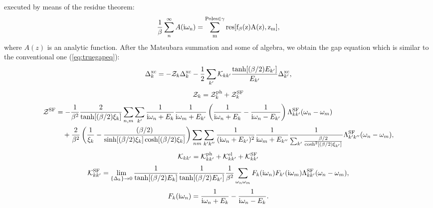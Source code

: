 executed by means of the residue theorem:
%
\begin{equation}
	\frac{1}{\beta} \sum_{n}^{\infty}A(\rm i\omega_n) = 
	\sum_{m}^{{\rm Poles} \in \gamma} {\rm res}[f_{\beta}(z)A(z),z_{m}],
	\label{eq:residue}
\end{equation}
%
where $A(z)$ is an analytic function. After the Matsubara summation and some of algebra, we obtain
the gap equation which is similar to the conventional one (\ref{eq:truegapeq}):
%
\begin{equation}
	\Delta^{\rm xc}_{k} = -{\mathcal Z}_{k}\Delta^{\rm xc}_{k} - \frac{1}{2}
	\sum_{k'} {\mathcal K}_{kk'} \frac{\tanh[(\beta/2)E_{k'}]}
	{E_{k'}} \Delta^{\rm xc}_{k'},
	\label{eq:aftergapeq}
\end{equation}
%
\begin{equation}
	\mathcal Z_{k} = \mathcal Z^{\rm ph}_{k} + \mathcal Z^{\rm SF}_{k} 
	\label{eq:Zsum}
\end{equation}
%
\begin{equation}
	\begin{split}
	\mathcal Z^{\rm SF} &= - \frac{1}{\beta^2}\frac{2}{\tanh[(\beta/2)\xi_{k}]} 
	\sum_{n,m}\sum_{k'}\frac{1}{{\rm i}\omega_n + E_k}\frac{1}{{\rm i}\omega_m + E_{k'}}
	\left(\frac{1}{{\rm i}\omega_n + E_k} - \frac{1}{ {\rm i}\omega_n - E_{k'}} \right)\Lambda^{\rm SF}_{kk'}(\omega_n - \omega_m) \\
	&\quad + \frac{2}{\beta^2}\left(\frac{1}{\xi_k} - \frac{(\beta/2)}{\sinh[(\beta/2)\xi_k]\cosh[(\beta/2)\xi_k]} \right)
	\sum_{nm}\sum_{k'k''} \frac{1}{({\rm i}\omega_n + E_{k'})^2} \frac{1}{ {\rm i}\omega_m + E_{k''}}
	\frac{1}{\sum_{k'}\frac{\beta/2}{\cosh^2\left[(\beta/2)\xi_{k'}\right]}} \Lambda^{\rm SF}_{k'k''}(\omega_n - \omega_m),
	\label{eq:ZSFdef}
\end{split}
\end{equation}
%
\begin{equation}
	\mathcal K_{kk'} = \mathcal K^{\rm ph}_{kk'} + \mathcal K^{\rm el}_{kk'} + \mathcal K^{\rm SF}_{kk'}
	\label{eq:Ksum}
\end{equation}
%
\begin{equation}
	{\mathcal K}^{\rm SF}_{kk'} = 
	\lim_{\{\Delta_{k}\} \to 0}
	\frac{1}{\tanh[(\beta/2)E_{k}]}\frac{1}{\tanh[(\beta/2)E_{k'}]}
	\frac{1}{\beta^2}
	\sum_{\omega_n\omega_m}
	F_{k}({\rm i}\omega_n)F_{k'}({\rm i}\omega_m)
	\Lambda^{\rm SF}_{kk'}(\omega_n - \omega_m),
	\label{eq:KSFdef}
\end{equation}
%
\begin{equation}
	F_{k}({\rm i}\omega_n) = \frac{1}{ {\rm i}\omega_n + E_{k}} - 
	\frac{1}{ {\rm i}\omega_n - E_{k}}.
	\label{eq:Fkdef}
\end{equation}
